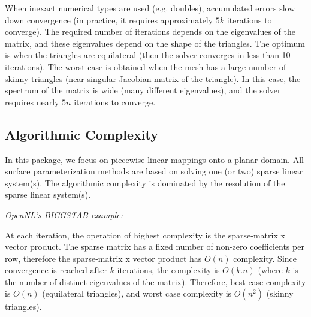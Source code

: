 When inexact numerical types are used (e.g. doubles), accumulated errors slow down convergence
(in practice, it requires approximately $5k$ iterations to converge).
The required number of iterations depends on the eigenvalues of the matrix, and these eigenvalues depend
on the shape of the triangles. The optimum is when the triangles are equilateral (then the solver converges
in less than 10 iterations). The worst case is obtained when the mesh has a large number of skinny triangles (near-singular Jacobian matrix of the triangle). In this case, the spectrum of the matrix
is wide (many different eigenvalues), and the solver requires nearly $5n$ iterations to converge.


\subsection{Algorithmic Complexity}

In this package, we focus on piecewise linear mappings onto a planar
domain. All surface parameterization methods are based on solving one (or two)
sparse linear system(s).
The algorithmic complexity is dominated by the resolution of the sparse linear system(s).

\emph{OpenNL's BICGSTAB example:}

At each iteration, the operation of highest complexity is the sparse-matrix x vector product.
The sparse matrix has a fixed number of non-zero coefficients per row,
therefore the sparse-matrix x vector product has $O(n)$ complexity.
Since convergence is reached after $k$ iterations, the complexity is $O(k.n)$
(where $k$ is the number of distinct eigenvalues of the matrix).
Therefore, best case complexity is $O(n)$ (equilateral triangles),
and worst case complexity is $O(n^2)$ (skinny triangles).

